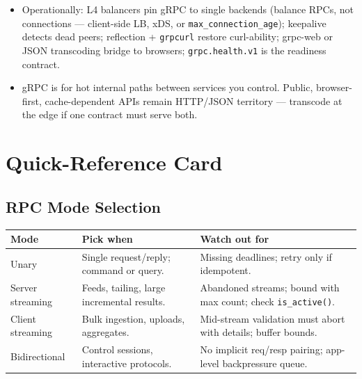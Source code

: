 \begin{itemize}
        live. Business logic never threads metadata by hand.
  \item Operationally: L4 balancers pin gRPC to single backends (balance
        RPCs, not connections --- client-side LB, xDS, or
        \texttt{max\_connection\_age}); keepalive detects dead peers;
        reflection + \texttt{grpcurl} restore curl-ability; grpc-web or JSON
        transcoding bridge to browsers; \texttt{grpc.health.v1} is the
        readiness contract.
  \item gRPC is for hot internal paths between services you control. Public,
        browser-first, cache-dependent APIs remain HTTP/JSON territory ---
        transcode at the edge if one contract must serve both.
\end{itemize}

\section{Quick-Reference Card}
\label{sec:ch13-quickref}

\subsection*{RPC Mode Selection}
\begin{table}[h]
  \centering
  \small
  \begin{tabularx}{\textwidth}{l X X}
    \toprule
    \textbf{Mode} & \textbf{Pick when} & \textbf{Watch out for} \\
    \midrule
    Unary & Single request/reply; command or query. & Missing deadlines; retry only if idempotent. \\
    Server streaming & Feeds, tailing, large incremental results. & Abandoned streams; bound with max count; check \texttt{is\_active()}. \\
    Client streaming & Bulk ingestion, uploads, aggregates. & Mid-stream validation must abort with details; buffer bounds. \\
    Bidirectional & Control sessions, interactive protocols. & No implicit req/resp pairing; app-level backpressure queue. \\
    \bottomrule
  \end{tabularx}
\end{table}

